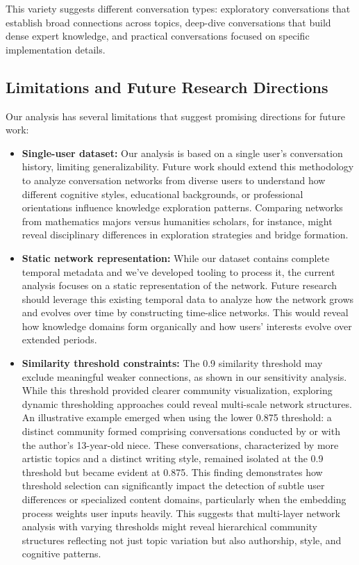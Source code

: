 \documentclass[10pt, a4paper]{article}
\begin{document}
This variety suggests different conversation types: exploratory conversations that establish broad connections across topics, deep-dive conversations that build dense expert knowledge, and practical conversations focused on specific implementation details.

\subsection{Limitations and Future Research Directions}

Our analysis has several limitations that suggest promising directions for future work:

\begin{itemize}
    \item \textbf{Single-user dataset:} Our analysis is based on a single user's conversation history, limiting generalizability. Future work should extend this methodology to analyze conversation networks from diverse users to understand how different cognitive styles, educational backgrounds, or professional orientations influence knowledge exploration patterns. Comparing networks from mathematics majors versus humanities scholars, for instance, might reveal disciplinary differences in exploration strategies and bridge formation.
    
    \item \textbf{Static network representation:} While our dataset contains complete temporal metadata and we've developed tooling to process it, the current analysis focuses on a static representation of the network. Future research should leverage this existing temporal data to analyze how the network grows and evolves over time by constructing time-slice networks. This would reveal how knowledge domains form organically and how users' interests evolve over extended periods.
    
    \item \textbf{Similarity threshold constraints:} The 0.9 similarity threshold may exclude meaningful weaker connections, as shown in our sensitivity analysis. While this threshold provided clearer community visualization, exploring dynamic thresholding approaches could reveal multi-scale network structures. An illustrative example emerged when using the lower 0.875 threshold: a distinct community formed comprising conversations conducted by or with the author's 13-year-old niece. These conversations, characterized by more artistic topics and a distinct writing style, remained isolated at the 0.9 threshold but became evident at 0.875. This finding demonstrates how threshold selection can significantly impact the detection of subtle user differences or specialized content domains, particularly when the embedding process weights user inputs heavily. This suggests that multi-layer network analysis with varying thresholds might reveal hierarchical community structures reflecting not just topic variation but also authorship, style, and cognitive patterns.
    

\end{itemize}
\end{document}
